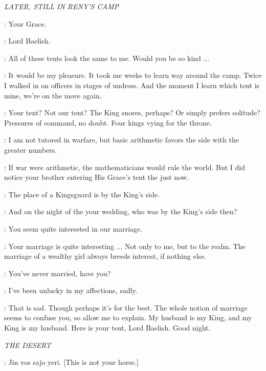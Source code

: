 \scene

\textit{LATER, STILL IN RENY'S CAMP} 


\LITTLEFINGER: Your Grace. 

\MARGAERY: Lord Baelish. 

\LITTLEFINGER: All of these tents look the same to me. Would you be so kind $\ldots$  

\MARGAERY: It would be my pleasure. It took me weeks to learn way around the camp. Twice I walked in on officers in stages of undress. And the moment I learn which tent is mine, we're on the move again. 

\LITTLEFINGER: Your tent? Not our tent? The King snores, perhaps? Or simply prefers solitude? Pressures of command, no doubt. Four kings vying for the throne. 

\MARGAERY: I am not tutored in warfare, but basic arithmetic favors the side with the greater numbers. 

\LITTLEFINGER: If war were arithmetic, the mathematicians would rule the world. But I did notice your brother entering His Grace's tent the just now. 

\MARGAERY: The place of a Kingsguard is by the King's side. 

\LITTLEFINGER: And on the night of the your wedding, who was by the King's side then? 

\MARGAERY: You seem quite interested in our marriage. 

\LITTLEFINGER: Your marriage is quite interesting $\ldots$ Not only to me, but to the realm. The marriage of a wealthy girl always breeds interest, if nothing else. 

\MARGAERY: You've never married, have you? 

\LITTLEFINGER: I've been unlucky in my affections, sadly. 

\MARGAERY: That is sad. Though perhaps it's for the best. The whole notion of marriage seems to confuse you, so allow me to explain. My husband is my King, and my King is my husband. Here is your tent, Lord Baelish. Good night. 


\scene

\textit{THE DESERT} 


\DAENERYS: Jin vos sajo yeri. [This is not your horse.] 

